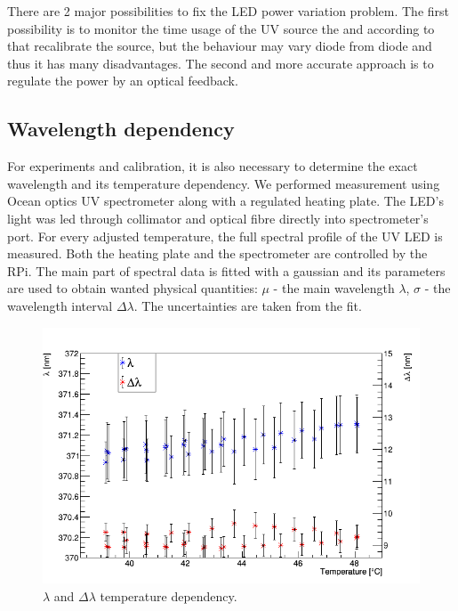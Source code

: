 \par
There are 2 major possibilities to fix the LED power variation problem. The first possibility is to monitor the time usage of the UV source the and according to that recalibrate the source, but the behaviour may vary diode from diode and thus it has many disadvantages. The second and more accurate approach is to regulate the power by an optical feedback.    


\subsection{Wavelength dependency}

For experiments and calibration, it is also necessary to determine the exact wavelength and its temperature dependency. We performed measurement using Ocean optics UV spectrometer along with a regulated heating plate. The LED's light was led through collimator and optical fibre directly into spectrometer's port. For every adjusted temperature, the full spectral profile of the UV LED is measured. Both the heating plate and the spectrometer are controlled by the RPi. The main part of spectral data is fitted with a gaussian and its parameters are used to obtain wanted physical quantities: $\mu$ - the main wavelength $\lambda$, $\sigma$ - the wavelength interval $\Delta \lambda$. The uncertainties are taken from the fit.


\begin{figure}[H]
 \centering
 \includegraphics[scale=0.65]{./pictures/SpectreShakeWave}
 \caption{$\lambda$ and $\Delta \lambda$ temperature dependency.}
 \label{wavdep}
\end{figure}

